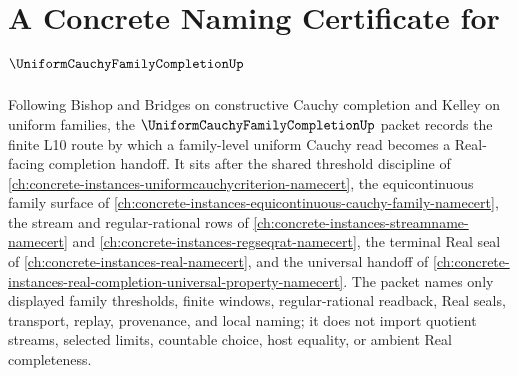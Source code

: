 \chapter{A Concrete Naming Certificate for $\UniformCauchyFamilyCompletionUp$}
\label{ch:concrete-instances-uniform-cauchy-family-completion-namecert}

Following Bishop and Bridges on constructive Cauchy completion and Kelley on uniform families, the $\UniformCauchyFamilyCompletionUp$ packet records the finite L10 route by which a family-level uniform Cauchy read becomes a Real-facing completion handoff. It sits after the shared threshold discipline of \autoref{ch:concrete-instances-uniformcauchycriterion-namecert}, the equicontinuous family surface of \autoref{ch:concrete-instances-equicontinuous-cauchy-family-namecert}, the stream and regular-rational rows of \autoref{ch:concrete-instances-streamname-namecert} and \autoref{ch:concrete-instances-regseqrat-namecert}, the terminal Real seal of \autoref{ch:concrete-instances-real-namecert}, and the universal handoff of \autoref{ch:concrete-instances-real-completion-universal-property-namecert}. The packet names only displayed family thresholds, finite windows, regular-rational readback, Real seals, transport, replay, provenance, and local naming; it does not import quotient streams, selected limits, countable choice, host equality, or ambient Real completeness.

